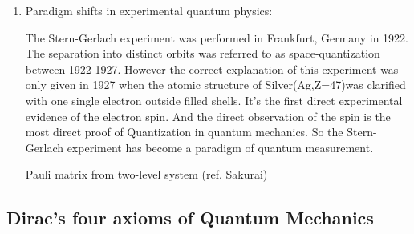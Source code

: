\documentclass[12pt]{article}
\numberwithin{equation}{section}
\begin{document}
\begin{enumerate}
\item Paradigm shifts in experimental quantum physics: \par
	The Stern-Gerlach experiment was performed in Frankfurt, Germany in 1922. The separation into distinct orbits was referred to as space-quantization between 1922-1927. However the correct explanation of this experiment was only given in 1927 when the atomic structure of Silver(Ag,Z=47)was clarified with one single electron outside filled shells. It's {\color{orange}the first direct experimental evidence of the electron spin}. And the direct observation of the spin is {\color{orange}the most direct proof of Quantization} in quantum mechanics. So the Stern-Gerlach experiment has become a {\color{orange}paradigm of quantum measurement}. \par
	Pauli matrix from two-level system (ref. Sakurai)
\end{enumerate}
\subsection{Dirac's four axioms of Quantum Mechanics}
\end{document}
